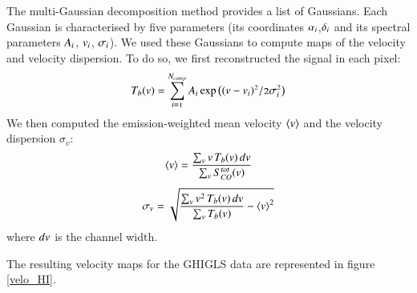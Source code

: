 \documentclass[traditabstract]{aa}
\begin{document}
   The multi-Gaussian decomposition method provides a list of Gaussians. Each Gaussian is characterised by five parameters (its coordinates $\mathnormal{\alpha_i}$,$\mathnormal{\delta_i}$ and its spectral parameters $\mathnormal{A_i}$, $\mathnormal{v_i}$, $\mathnormal{\sigma_i}$). We used these Gaussians to compute maps of the velocity and velocity dispersion. To do so, we first reconstructed the signal in each pixel:
\begin{equation}
  \mathnormal{T_b(v)=\sum_{i=1}^{N_{comp}} A_i \exp\left( (v-v_i)^2/2\sigma_i^2 \right)}
\end{equation}
%
We then computed the emission-weighted mean velocity $\left< v \right>$ and the velocity dispersion $\sigma_v$:
\begin{equation}
  \mathnormal{\left< v \right>=\frac{\sum_v v\, T_b(v)\, dv}{\sum_v S_{CO}^{tot}(v)}}
\end{equation}
\begin{equation}
  \mathnormal{\sigma_v=\sqrt{\frac{\sum_v v^2\, T_b(v)\, dv}{\sum_v T_b(v)}-\left< v \right>^2}}
\end{equation} 
where $\mathnormal{dv}$ is the channel width.

   The resulting velocity maps for the GHIGLS data are represented in figure \ref{velo_HI}.
\end{document}
